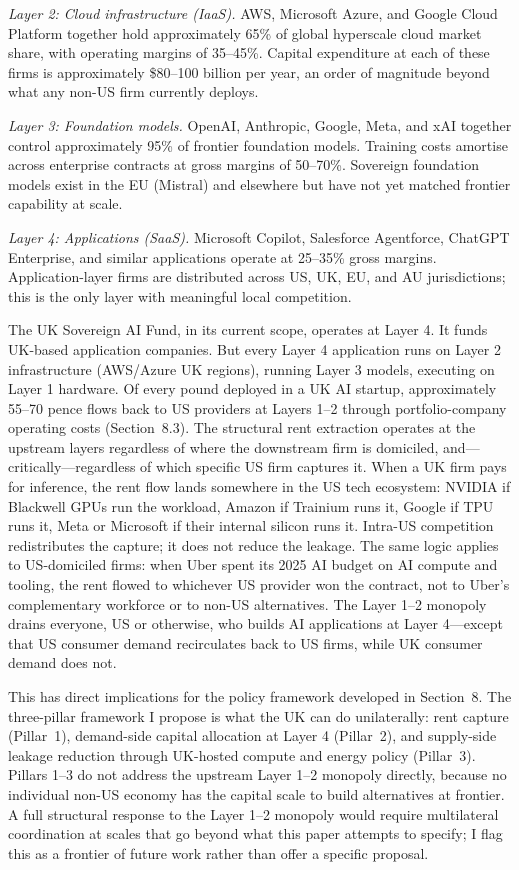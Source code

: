 \documentclass[11pt,letterpaper]{article}
\theoremstyle{remark}
\begin{document}
\textit{Layer 2: Cloud infrastructure (IaaS).} {AWS}, Microsoft Azure, and Google Cloud Platform together hold approximately 65\% of global hyperscale cloud market share, with operating margins of 35--45\%. Capital expenditure at each of these firms is approximately \$80--100 billion per year, an order of magnitude beyond what any non-{US} firm currently deploys.

\textit{Layer 3: Foundation models.} OpenAI, Anthropic, Google, Meta, and xAI together control approximately 95\% of frontier foundation models. Training costs amortise across enterprise contracts at gross margins of 50--70\%. Sovereign foundation models exist in the {EU} (Mistral) and elsewhere but have not yet matched frontier capability at scale.

\textit{Layer 4: Applications (SaaS).} Microsoft Copilot, Salesforce Agentforce, ChatGPT Enterprise, and similar applications operate at 25--35\% gross margins. Application-layer firms are distributed across {US}, {UK}, {EU}, and {AU} jurisdictions; this is the only layer with meaningful local competition.

The {UK} Sovereign {AI} Fund, in its current scope, operates at Layer 4. It funds {UK}-based application companies. But every Layer 4 application runs on Layer 2 infrastructure ({AWS}/Azure {UK} regions), running Layer 3 models, executing on Layer 1 hardware. Of every pound deployed in a {UK} {AI} startup, approximately 55--70 pence flows back to {US} providers at Layers 1--2 through portfolio-company operating costs (Section~8.3). The structural rent extraction operates at the upstream layers regardless of where the downstream firm is domiciled, and---critically---regardless of which specific {US} firm captures it. When a {UK} firm pays for inference, the rent flow lands somewhere in the {US} tech ecosystem: NVIDIA if Blackwell {GPUs} run the workload, Amazon if Trainium runs it, Google if {TPU} runs it, Meta or Microsoft if their internal silicon runs it. Intra-{US} competition redistributes the capture; it does not reduce the leakage. The same logic applies to {US}-domiciled firms: when Uber spent its 2025 {AI} budget on {AI} compute and tooling, the rent flowed to whichever {US} provider won the contract, not to Uber's complementary workforce or to non-{US} alternatives. The Layer 1--2 monopoly drains everyone, {US} or otherwise, who builds {AI} applications at Layer 4---except that {US} consumer demand recirculates back to {US} firms, while {UK} consumer demand does not.

This has direct implications for the policy framework developed in Section~8. The three-pillar framework I propose is what the {UK} can do unilaterally: rent capture (Pillar~1), demand-side capital allocation at Layer 4 (Pillar~2), and supply-side leakage reduction through {UK}-hosted compute and energy policy (Pillar~3). Pillars 1--3 do not address the upstream Layer 1--2 monopoly directly, because no individual non-{US} economy has the capital scale to build alternatives at frontier. A full structural response to the Layer 1--2 monopoly would require multilateral coordination at scales that go beyond what this paper attempts to specify; I flag this as a frontier of future work rather than offer a specific proposal.
\end{document}
